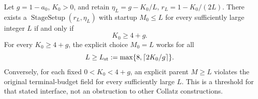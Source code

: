 \begin{proposition}
\label{prop:Shaik-exact-moving-startup}
Let \(g=1-a_0\), \(K_0>0\), and retain
\(\eta_L=g-K_0/L\), \(r_L=1-K_0/(2L)\).
There exists a \(\operatorname{StageSetup}(r_L,\eta_L)\) with
startup \(M_0\le L\) for every sufficiently large integer \(L\)
if and only if
\begin{equation}\label{eq:Shaik-exact-moving-threshold}
 K_0\ge4+g.
\end{equation}
For every \(K_0\ge4+g\), the explicit choice \(M_0=L\) works for all
\[
 L\ge L_{\rm st}:=\max\{8,\lceil2K_0/g\rceil\}.
\]
Conversely, for each fixed \(0<K_0<4+g\), an explicit parent
\(M\ge L\) violates the original terminal-budget field for every
sufficiently large \(L\).
This is a threshold for that stated interface, not an obstruction
to other Collatz constructions.
\end{proposition}
